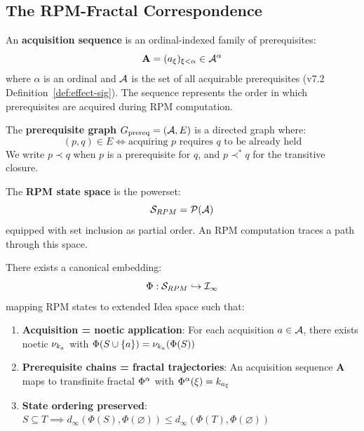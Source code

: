 \subsection{The RPM-Fractal Correspondence}

\begin{definition}
\label{def:acquisition-sequence}
An \textbf{acquisition sequence} is an ordinal-indexed family of prerequisites:
\[
\mathbf{A} = (a_\xi)_{\xi < \alpha} \in \mathcal{A}^\alpha
\]
where $\alpha$ is an ordinal and $\mathcal{A}$ is the set of all acquirable prerequisites (v7.2 Definition~\ref*{def:effect-sig}). The sequence represents the order in which prerequisites are acquired during RPM computation.
\end{definition}

\begin{definition}
\label{def:prerequisite-graph}
The \textbf{prerequisite graph} $G_\mathrm{prereq} = (\mathcal{A}, E)$ is a directed graph where:
\[
(p, q) \in E \iff \text{acquiring } p \text{ requires } q \text{ to be already held}
\]
We write $p \prec q$ when $p$ is a prerequisite for $q$, and $p \prec^* q$ for the transitive closure.
\end{definition}

\begin{definition}
\label{def:rpm-state-space}
The \textbf{RPM state space} is the powerset:
\[
\mathcal{S}_{RPM} = \mathcal{P}(\mathcal{A})
\]
equipped with set inclusion as partial order. An RPM computation traces a path through this space.
\end{definition}

\begin{theorem}
\label{thm:rpm-fractal-embedding}
There exists a canonical embedding:
\[
\Phi : \mathcal{S}_{RPM} \hookrightarrow \mathcal{I}_\infty
\]
mapping RPM states to extended Idea space such that:
\begin{enumerate}[label=(\roman*)]
  \item \textbf{Acquisition = noetic application}: For each acquisition $a \in \mathcal{A}$, there exists noetic $\nu_{k_a}$ with $\Phi(S \cup \{a\}) = \nu_{k_a}(\Phi(S))$
  \item \textbf{Prerequisite chains = fractal trajectories}: An acquisition sequence $\mathbf{A}$ maps to transfinite fractal $\Phi^{\alpha}$ with $\Phi^{\alpha}(\xi) = k_{a_\xi}$
  \item \textbf{State ordering preserved}: $S \subseteq T \implies d_\infty(\Phi(S), \Phi(\varnothing)) \leq d_\infty(\Phi(T), \Phi(\varnothing))$
\end{enumerate}
\end{theorem}

